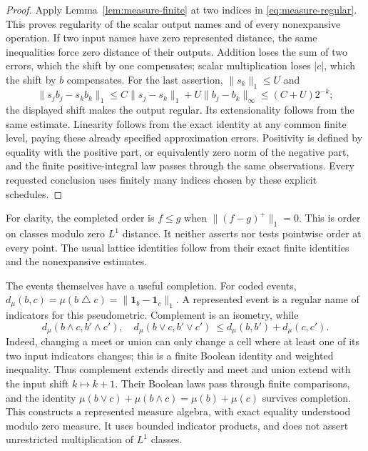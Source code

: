 \begin{proof}
Apply Lemma~\ref{lem:measure-finite} at two indices in
\eqref{eq:measure-regular}.  This proves regularity of the scalar output
names and of every nonexpansive operation.  If two input names have zero
represented distance, the same inequalities force zero distance of their
outputs.  Addition loses the sum of two errors, which the shift by one
compensates; scalar multiplication loses \(|c|\), which the shift by \(b\)
compensates.  For the last assertion, \(\|s_k\|_1\leq U\) and
\[
 \|s_jb_j-s_kb_k\|_1
 \leq C\|s_j-s_k\|_1+U\|b_j-b_k\|_\infty
 \leq(C+U)2^{-k};
\]
the displayed shift makes the output regular.  Its extensionality follows
from the same estimate.  Linearity follows from the exact identity at any common finite
level, paying these already specified approximation errors.  Positivity is
defined by equality with the positive part, or equivalently zero norm of the
negative part, and the finite positive-integral law passes through the same
observations.  Every requested conclusion uses finitely many indices chosen
by these explicit schedules.
\end{proof}

For clarity, the completed order is
\(f\leq g\) when \(\|(f-g)^+\|_1=0\).  This is order on classes modulo
zero \(L^1\) distance.  It neither asserts nor tests pointwise order at every
point.  The usual lattice identities follow from their exact finite
identities and the nonexpansive estimates.

The events themselves have a useful completion.  For coded events,
\(d_\mu(b,c)=\mu(b\mathbin{\triangle}c)
=\|\mathbf1_b-\mathbf1_c\|_1\).  A represented event is a regular name
of indicators for this pseudometric.  Complement is an isometry, while
\[
 d_\mu(b\wedge c,b'\wedge c'),\quad
 d_\mu(b\vee c,b'\vee c')
 \ \leq d_\mu(b,b')+d_\mu(c,c').
\]
Indeed, changing a meet or union can only change a cell where at least one
of its two input indicators changes; this is a finite Boolean identity and
weighted inequality.  Thus complement extends directly and meet and union
extend with the input shift \(k\mapsto k+1\).  Their Boolean laws pass
through finite comparisons, and the identity
\(\mu(b\vee c)+\mu(b\wedge c)=\mu(b)+\mu(c)\) survives completion.
This constructs a represented measure algebra, with exact equality understood
modulo zero measure.  It uses bounded indicator products, and does not assert
unrestricted multiplication of \(L^1\) classes.

